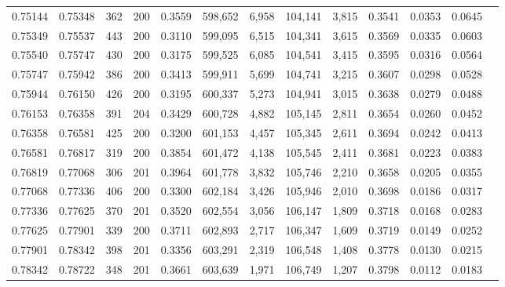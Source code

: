 \begin{tabular}{rrrrrrrrrrrrr}
0.75144 & 0.75348 &   362 & 200 &                                     0.3559 & 598,652 &   6,958 & 104,141 &   3,815 & 0.3541 & 0.0353 & 0.0645 \\
0.75349 & 0.75537 &   443 & 200 &                                     0.3110 & 599,095 &   6,515 & 104,341 &   3,615 & 0.3569 & 0.0335 & 0.0603 \\
0.75540 & 0.75747 &   430 & 200 &                                     0.3175 & 599,525 &   6,085 & 104,541 &   3,415 & 0.3595 & 0.0316 & 0.0564 \\
0.75747 & 0.75942 &   386 & 200 &                                     0.3413 & 599,911 &   5,699 & 104,741 &   3,215 & 0.3607 & 0.0298 & 0.0528 \\
0.75944 & 0.76150 &   426 & 200 &                                     0.3195 & 600,337 &   5,273 & 104,941 &   3,015 & 0.3638 & 0.0279 & 0.0488 \\
0.76153 & 0.76358 &   391 & 204 &                                     0.3429 & 600,728 &   4,882 & 105,145 &   2,811 & 0.3654 & 0.0260 & 0.0452 \\
0.76358 & 0.76581 &   425 & 200 &                                     0.3200 & 601,153 &   4,457 & 105,345 &   2,611 & 0.3694 & 0.0242 & 0.0413 \\
0.76581 & 0.76817 &   319 & 200 &                                     0.3854 & 601,472 &   4,138 & 105,545 &   2,411 & 0.3681 & 0.0223 & 0.0383 \\
0.76819 & 0.77068 &   306 & 201 &                                     0.3964 & 601,778 &   3,832 & 105,746 &   2,210 & 0.3658 & 0.0205 & 0.0355 \\
0.77068 & 0.77336 &   406 & 200 &                                     0.3300 & 602,184 &   3,426 & 105,946 &   2,010 & 0.3698 & 0.0186 & 0.0317 \\
0.77336 & 0.77625 &   370 & 201 &                                     0.3520 & 602,554 &   3,056 & 106,147 &   1,809 & 0.3718 & 0.0168 & 0.0283 \\
0.77625 & 0.77901 &   339 & 200 &                                     0.3711 & 602,893 &   2,717 & 106,347 &   1,609 & 0.3719 & 0.0149 & 0.0252 \\
0.77901 & 0.78342 &   398 & 201 &                                     0.3356 & 603,291 &   2,319 & 106,548 &   1,408 & 0.3778 & 0.0130 & 0.0215 \\
0.78342 & 0.78722 &   348 & 201 &                                     0.3661 & 603,639 &   1,971 & 106,749 &   1,207 & 0.3798 & 0.0112 & 0.0183 \\

\end{tabular}
